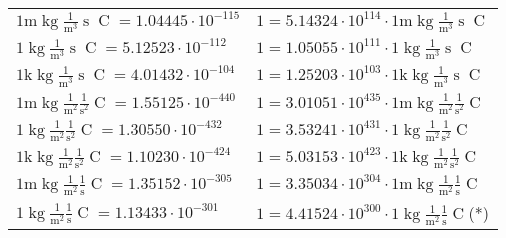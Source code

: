\begin{center}
\begin{longtable}{l l}
{\color{gray}$1 \bm{\mathrm{ m}}\operatorname{kg}\frac1{\operatorname{m}^3}{\operatorname{s}}{\operatorname{C}}{} = 1.04445\cdot10^{-115} $}   & {\color{gray}$ 1 = 5.14324\cdot10^{114} \cdot 1 \bm{\mathrm{ m}}\operatorname{kg}\frac1{\operatorname{m}^3}{\operatorname{s}}{\operatorname{C}}{}$}  \\
{\color{black}$1 \bm{\mathrm{ }}\operatorname{kg}\frac1{\operatorname{m}^3}{\operatorname{s}}{\operatorname{C}}{} = 5.12523\cdot10^{-112} $}   & {\color{black}$ 1 = 1.05055\cdot10^{111} \cdot 1 \bm{\mathrm{ }}\operatorname{kg}\frac1{\operatorname{m}^3}{\operatorname{s}}{\operatorname{C}}{}$}  \\
{\color{gray}$1 \bm{\mathrm{ k}}\operatorname{kg}\frac1{\operatorname{m}^3}{\operatorname{s}}{\operatorname{C}}{} = 4.01432\cdot10^{-104} $}   & {\color{gray}$ 1 = 1.25203\cdot10^{103} \cdot 1 \bm{\mathrm{ k}}\operatorname{kg}\frac1{\operatorname{m}^3}{\operatorname{s}}{\operatorname{C}}{}$}  \\
{\color{gray}$1 \bm{\mathrm{ m}}\operatorname{kg}\frac1{\operatorname{m}^2}\frac1{\operatorname{s}^2}{\operatorname{C}}{} = 1.55125\cdot10^{-440} $}   & {\color{gray}$ 1 = 3.01051\cdot10^{435} \cdot 1 \bm{\mathrm{ m}}\operatorname{kg}\frac1{\operatorname{m}^2}\frac1{\operatorname{s}^2}{\operatorname{C}}{}$}  \\
{\color{black}$1 \bm{\mathrm{ }}\operatorname{kg}\frac1{\operatorname{m}^2}\frac1{\operatorname{s}^2}{\operatorname{C}}{} = 1.30550\cdot10^{-432} $}   & {\color{black}$ 1 = 3.53241\cdot10^{431} \cdot 1 \bm{\mathrm{ }}\operatorname{kg}\frac1{\operatorname{m}^2}\frac1{\operatorname{s}^2}{\operatorname{C}}{}$}  \\
{\color{gray}$1 \bm{\mathrm{ k}}\operatorname{kg}\frac1{\operatorname{m}^2}\frac1{\operatorname{s}^2}{\operatorname{C}}{} = 1.10230\cdot10^{-424} $}   & {\color{gray}$ 1 = 5.03153\cdot10^{423} \cdot 1 \bm{\mathrm{ k}}\operatorname{kg}\frac1{\operatorname{m}^2}\frac1{\operatorname{s}^2}{\operatorname{C}}{}$}  \\
{\color{gray}$1 \bm{\mathrm{ m}}\operatorname{kg}\frac1{\operatorname{m}^2}\frac1{\operatorname{s}}{\operatorname{C}}{} = 1.35152\cdot10^{-305} $}   & {\color{gray}$ 1 = 3.35034\cdot10^{304} \cdot 1 \bm{\mathrm{ m}}\operatorname{kg}\frac1{\operatorname{m}^2}\frac1{\operatorname{s}}{\operatorname{C}}{}$}  \\
{\color{black}$1 \bm{\mathrm{ }}\operatorname{kg}\frac1{\operatorname{m}^2}\frac1{\operatorname{s}}{\operatorname{C}}{} = 1.13433\cdot10^{-301} $}   & {\color{black}$ 1 = 4.41524\cdot10^{300} \cdot 1 \bm{\mathrm{ }}\operatorname{kg}\frac1{\operatorname{m}^2}\frac1{\operatorname{s}}{\operatorname{C}}{}$}\quad(*)\\

\end{longtable}
\end{center}
